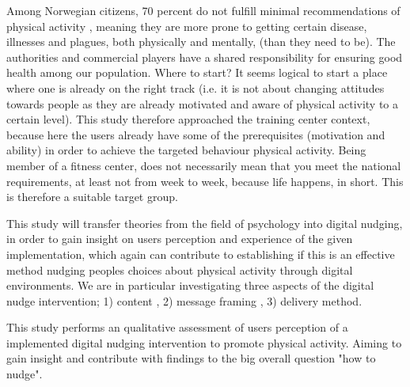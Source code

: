 Among Norwegian citizens, 70 percent do not fulfill minimal recommendations of physical activity \cite{folkehelseinstituttet_fysisk_nodate}, meaning they are more prone to getting certain disease, illnesses and plagues, both physically and mentally, (than they need to be). The authorities and commercial players have a shared responsibility for ensuring good health among our population. Where to start? It seems logical to start a place where one is already on the right track (i.e. it is not about changing attitudes towards people as they are already motivated and aware of physical activity to a certain level). This study therefore approached the training center context, because here the users already have some of the prerequisites (motivation and ability) in order to achieve the targeted behaviour physical activity. Being member of a fitness center, does not necessarily mean that you meet the national requirements, at least not from week to week, because life happens, in short. This is therefore a suitable target group.


This study will transfer theories from the field of psychology into digital nudging, in order to gain insight on users perception and experience of the given implementation, which again can contribute to establishing if this is an effective method nudging peoples choices about physical activity through digital environments. We are in particular investigating three aspects of the digital nudge intervention; 1) content , 2) message framing , 3) delivery method.  

This study performs an qualitative assessment of users perception of a implemented digital nudging intervention to promote physical activity. Aiming to gain insight and contribute with findings to the big overall question "how to nudge".




